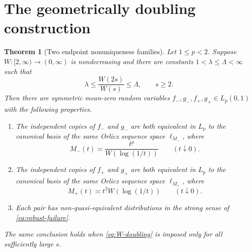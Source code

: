\documentclass[11pt]{article}
\newtheorem{theorem}{Theorem}
\theoremstyle{definition}
\theoremstyle{remark}
\begin{document}
\section{The geometrically doubling construction}

\begin{theorem}[Two endpoint nonuniqueness families]\label{thm:main}
Let $1\leq p<2$.  Suppose $W:[2,\infty)\to(0,\infty)$ is nondecreasing and
there are constants $1<\lambda\leq\Lambda<\infty$ such that
\begin{equation}\label{eq:W-doubling}
  \lambda\leq\frac{W(2s)}{W(s)}\leq\Lambda,
  \qquad s\geq2.
\end{equation}
Then there are symmetric mean-zero random variables
$f_-,g_-,f_+,g_+\in L_p(0,1)$ with the following properties.
\begin{enumerate}[label=\textup{(\roman*)}]
  \item The independent copies of $f_-$ and $g_-$ are both equivalent in
  $L_p$ to the canonical basis of the same Orlicz sequence space
  $\ell_{M_-}$, where
  \[
    M_-(t)\asymp \frac{t^p}{W(\log(1/t))}\qquad(t\downarrow0).
  \]
  \item The independent copies of $f_+$ and $g_+$ are both equivalent in
  $L_p$ to the canonical basis of the same Orlicz sequence space
  $\ell_{M_+}$, where
  \[
    M_+(t)\asymp t^2W(\log(1/t))\qquad(t\downarrow0).
  \]
  \item Each pair has non-quasi-equivalent distributions in the strong sense
  of \eqref{eq:robust-failure}.
\end{enumerate}
The same conclusion holds when \eqref{eq:W-doubling} is imposed only for all
sufficiently large $s$.
\end{theorem}
\end{document}
